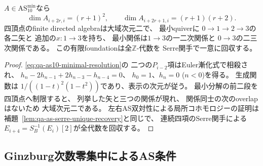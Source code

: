 \begin{lemma}[Hilbert関数と有限quiver]
\label{lem:qa-as10-hilbert-foundation}
$A\in\mathrm{AS}_{10}^{\mathrm{min}}$なら
\[
\dim A_{i+2r,i}=(r+1)^2,\qquad
\dim A_{i+2r+1,i}=(r+1)(r+2).
\]
四頂点のfinite directed algebraは大域次元二で、
最小quiverに
$0\to1\to2\to3$の各二矢と
追加の$x:1\to3$を持ち、
最小関係は$1\to3$の一二次関係と
$0\to3$の二三次関係である。
この有限foundationは全$\mathbb Z$-代数を
Serre関手で一意に回収する。
\end{lemma}
\begin{proof}
\eqref{eq:qa-as10-minimal-resolution}の
二つの$P_{i-2}$項はEuler漸化式で相殺され、
$h_n-2h_{n-1}+2h_{n-3}-h_{n-4}=0$、
$h_0=1$、$h_n=0$ ($n<0$)を得る。
生成関数は
$1/((1-t)^2(1-t^2))$であり、表示の次元が従う。
最小分解の前二段を四頂点へ制限すると、
列挙した矢と三つの関係が現れ、
関係同士の次のoverlapはないため
大域次元二である。
左右AS双対性による局所コホモロジーの証明は
補題~\ref{lem:qa-as-serre-unique-recovery}と同じで、
連続四項のSerre関手による
$E_{i+4}=S_B^{-1}(E_i)[2]$が全代数を回収する。
\end{proof}

\subsection{Ginzburg次数零集中によるAS条件}
\label{subsec:qa-as10-ginzburg}

